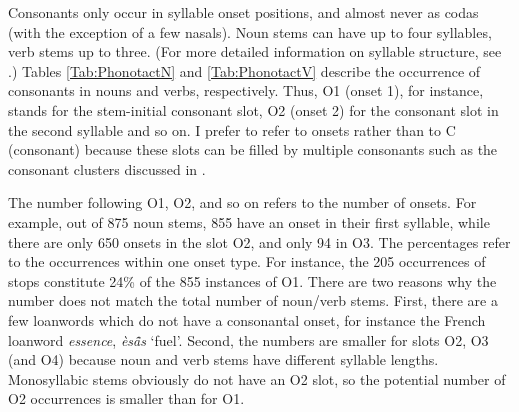 Consonants only occur in syllable onset positions, and almost never as codas (with the exception of a few nasals). Noun stems can have up to four syllables, verb stems up to three. (For more detailed information on syllable structure, see .) Tables \ref{Tab:PhonotactN} and \ref{Tab:PhonotactV} describe the occurrence of consonants in nouns and verbs, respectively. Thus, O1 (onset 1), for instance, stands for the stem-initial consonant slot, O2 (onset 2) for the consonant slot in the second syllable and so on. I prefer to refer to onsets rather than to C (consonant) because these slots can be filled by multiple consonants such as the consonant clusters discussed in .

The number following O1, O2, and so on refers to the number of onsets. For example, out of 875 noun stems, 855 have an onset in their first syllable, while there are only 650 onsets in the slot O2, and only 94 in O3. The percentages refer to the occurrences within one onset type. For instance, the 205 occurrences of stops constitute 24\% of the 855 instances of O1.   There are two reasons why the number does not match the total number of noun/verb stems. First, there are a few loanwords which do not have a consonantal onset, for instance the French loanword {\itshape essence}, {\itshape èsã̂s} `fuel'. Second, the numbers are smaller for slots O2, O3 (and O4) because noun and verb stems have different syllable lengths. Monosyllabic stems obviously do not have an O2 slot, so the potential number of O2 occurrences is smaller than for O1.


